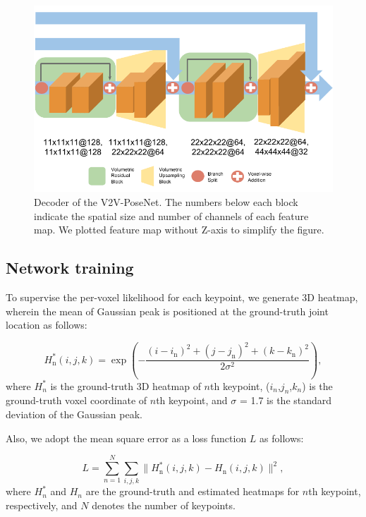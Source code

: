 \begin{figure}[t]
\begin{center}
   \includegraphics[width=1.0\linewidth]{decoder.pdf}
\end{center}
\vspace*{-5mm}
   \caption{Decoder of the V2V-PoseNet. The numbers below each block indicate the spatial size and number of channels of each feature map. We plotted feature map without Z-axis to simplify the figure.}
\vspace*{-4mm}
\label{fig:decoder}
\end{figure}



\subsection{Network training}
To supervise the per-voxel likelihood for each keypoint, we generate 3D heatmap, wherein the mean of Gaussian peak is positioned at the ground-truth joint location as follows: 

\begin{equation}
H_{\mathrm{n}}^*(i,j,k) = \exp\left(-\frac{(i-i_{\mathrm{n}})^2+(j-j_{\mathrm{n}})^2+(k-k_{\mathrm{n}})^2}{2\sigma^2}\right),
\end{equation}
where $H_{n}^{*}$ is the ground-truth 3D heatmap of $n$th keypoint, ($i_n$,$j_n$,$k_n$) is the ground-truth voxel coordinate of $n$th keypoint, and $\sigma$ = 1.7 is the standard deviation of the Gaussian peak.

Also, we adopt the mean square error as a loss function $L$ as follows:

\begin{equation}
L = \sum_{n=1}^{N} \sum_{i,j,k} \|H_{\mathrm{n}}^*(i,j,k)-H_{\mathrm{n}}(i,j,k)\|^2,
\end{equation}
where $H_{n}^{*}$ and $H_{n}$ are the ground-truth and estimated heatmaps for $n$th keypoint, respectively, and $N$ denotes the number of keypoints.



